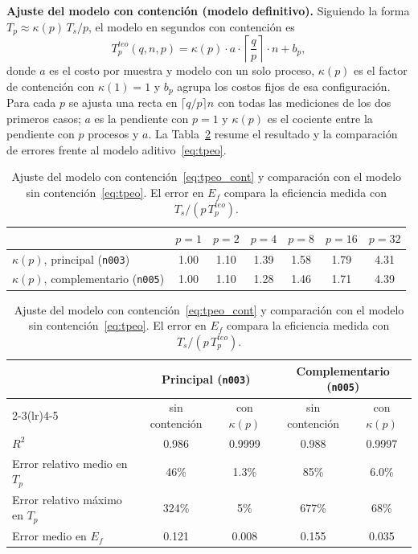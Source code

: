 \documentclass[11pt, a4paper]{article}
\begin{document}
\textbf{Ajuste del modelo con contención (modelo definitivo).} Siguiendo la forma $T_p \approx \kappa(p)\,T_s/p$, el modelo en segundos con contención es
\begin{equation}
T_p^{teo}(q, n, p) = \kappa(p)\cdot a \cdot \left\lceil \frac{q}{p} \right\rceil \cdot n + b_p,
\label{eq:tpeo_cont}
\end{equation}
donde $a$ es el costo por muestra y modelo con un solo proceso, $\kappa(p)$ es el factor de contención con $\kappa(1)=1$ y $b_p$ agrupa los costos fijos de esa configuración. Para cada $p$ se ajusta una recta en $\lceil q/p\rceil n$ con todas las mediciones de los dos primeros casos; $a$ es la pendiente con $p=1$ y $\kappa(p)$ es el cociente entre la pendiente con $p$ procesos y $a$. La Tabla~\ref{tab:ajuste_kappa} resume el resultado y la comparación de errores frente al modelo aditivo~\eqref{eq:tpeo}.

\begin{table}[H]
\centering
\small
\caption{Ajuste del modelo con contención~\eqref{eq:tpeo_cont} y comparación con el modelo sin contención~\eqref{eq:tpeo}. El error en $E_f$ compara la eficiencia medida con $T_s/(p\,T_p^{teo})$.}
\label{tab:ajuste_kappa}
\begin{tabular}{lcccccc}
\toprule
& $p=1$ & $p=2$ & $p=4$ & $p=8$ & $p=16$ & $p=32$ \\
\midrule
$\kappa(p)$, principal (\texttt{n003})      & 1.00 & 1.10 & 1.39 & 1.58 & 1.79 & 4.31 \\
$\kappa(p)$, complementario (\texttt{n005}) & 1.00 & 1.10 & 1.28 & 1.46 & 1.71 & 4.39 \\
\bottomrule
\end{tabular}

\vspace{0.6em}
\begin{tabular}{lcccc}
\toprule
& \multicolumn{2}{c}{Principal (\texttt{n003})} & \multicolumn{2}{c}{Complementario (\texttt{n005})} \\
\cmidrule(lr){2-3}\cmidrule(lr){4-5}
& sin contención & con $\kappa(p)$ & sin contención & con $\kappa(p)$ \\
\midrule
$R^2$                          & 0.986 & 0.9999 & 0.988 & 0.9997 \\
Error relativo medio en $T_p$  & 46\%  & 1.3\%  & 85\%  & 6.0\%  \\
Error relativo máximo en $T_p$ & 324\% & 5\%    & 677\% & 68\%   \\
Error medio en $E_f$           & 0.121 & 0.008  & 0.155 & 0.035  \\
\bottomrule
\end{tabular}
\end{table}
\end{document}
